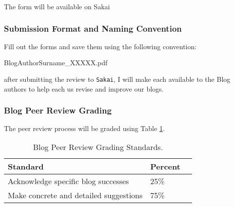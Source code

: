 The form will be available on Sakai

\subsubsection{Submission Format and Naming Convention}

Fill out the forms and save them using the following convention:

\begin{center}
BlogAuthorSurname\_XXXXX.pdf
\end{center}

\noindent after submitting the review to \texttt{Sakai}, I will make each available to the Blog authors to help each us revise and improve our blogs. 

\subsubsection{Blog Peer Review Grading}

The peer review process will be graded using Table \ref{tab:blogpeerreviewgrading}. 

\begin{table}[h]
\caption{Blog Peer Review Grading Standards.}
\label{tab:blogpeerreviewgrading}
\begin{tabular}{llr}\hline
Standard          &   Percent   & \\ \hline\hline
Acknowledge specific blog  successes & 25\% \\
Make concrete and detailed suggestions & 75\% \\
\hline
\end{tabular}
\end{table}


